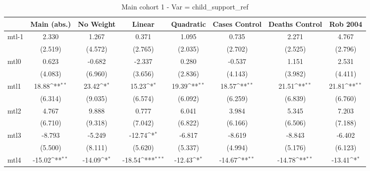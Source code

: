 \documentclass{article}
\begin{document}
{
\def\sym#1{\ifmmode^{#1}\else\(^{#1}\)\fi}
\begin{longtable}{l*{7}{c}}
\caption{Main cohort 1 - Var = child\_support\_ref}\\
\hline\hline\endfirsthead\hline\endhead\hline\endfoot\endlastfoot
                &\multicolumn{1}{c}{Main (abs.)}&\multicolumn{1}{c}{No Weight}&\multicolumn{1}{c}{Linear}&\multicolumn{1}{c}{Quadratic}&\multicolumn{1}{c}{Cases Control}&\multicolumn{1}{c}{Deaths Control}&\multicolumn{1}{c}{Rob 2004}\\
\hline
mtl-1           &    2.330         &    1.267         &    0.371         &    1.095         &    0.735         &    2.271         &    4.767         \\
                &  (2.519)         &  (4.572)         &  (2.765)         &  (2.035)         &  (2.702)         &  (2.525)         &  (2.796)         \\
mtl0            &    0.623         &   -0.682         &   -2.337         &    0.280         &   -0.537         &    1.151         &    2.531         \\
                &  (4.083)         &  (6.960)         &  (3.656)         &  (2.836)         &  (4.143)         &  (3.982)         &  (4.411)         \\
mtl1            &    18.88\sym{**} &    23.42\sym{*}  &    15.23\sym{*}  &    19.39\sym{**} &    18.57\sym{**} &    21.51\sym{**} &    21.81\sym{**} \\
                &  (6.314)         &  (9.035)         &  (6.574)         &  (6.092)         &  (6.259)         &  (6.839)         &  (6.760)         \\
mtl2            &    4.767         &    9.888         &    0.777         &    6.041         &    3.984         &    5.345         &    7.203         \\
                &  (6.710)         &  (9.318)         &  (7.042)         &  (6.822)         &  (6.166)         &  (6.506)         &  (7.188)         \\
mtl3            &   -8.793         &   -5.249         &   -12.74\sym{*}  &   -6.817         &   -8.619         &   -8.843         &   -6.402         \\
                &  (5.500)         &  (8.111)         &  (5.620)         &  (5.337)         &  (4.994)         &  (5.176)         &  (6.123)         \\
mtl4            &   -15.02\sym{**} &   -14.09\sym{*}  &   -18.54\sym{***}&   -12.43\sym{*}  &   -14.67\sym{**} &   -14.78\sym{**} &   -13.41\sym{*}  \\

\end{longtable}}
\end{document}

